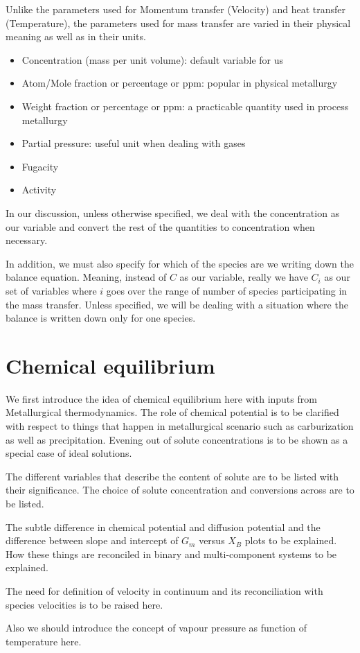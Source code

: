 Unlike the parameters used for Momentum transfer (Velocity) and heat transfer
(Temperature), the parameters used for mass transfer are varied in their
physical meaning as well as in their units.

\begin{itemize}
\item Concentration (mass per unit volume): default variable for us
\item Atom/Mole fraction or percentage or ppm: popular in physical metallurgy
\item Weight fraction or percentage or ppm: a practicable quantity used in
process metallurgy
\item Partial pressure: useful unit when dealing with gases
\item Fugacity
\item Activity
\end{itemize}

In our discussion, unless otherwise specified, we deal with the concentration as
our variable and convert the rest of the quantities to concentration when
necessary. 

In addition, we must also specify for which of the species are we writing down
the balance equation. Meaning, instead of $C$ as our variable, really we have
$C_i$ as our set of variables where $i$ goes over the range of number of species
participating in the mass transfer. Unless specified, we will be dealing with a
situation where the balance is written down only for one species.


\section{Chemical equilibrium}

We first introduce the idea of chemical equilibrium here with inputs from Metallurgical thermodynamics. The role of chemical potential is to be clarified with respect to things that happen in metallurgical scenario such as carburization as well as precipitation. Evening out of solute concentrations is to be shown as a special case of ideal solutions. 


The different variables that describe the content of solute are to be listed with their significance. The choice of solute concentration and conversions across are to be listed.


The subtle difference in chemical potential and diffusion potential and the difference between slope and intercept of $G_m$ versus $X_B$ plots to be explained. How these things are reconciled in binary and multi-component systems to be explained.


The need for definition of velocity in continuum and its reconciliation with species velocities is to be raised here.

Also we should introduce the concept of vapour pressure as function of temperature here.

